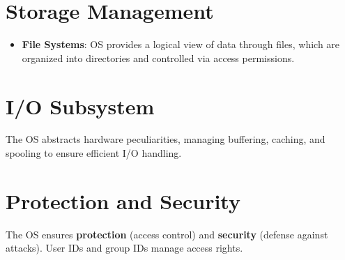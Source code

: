 \documentclass{article}
\begin{document}
\section{Storage Management}
\begin{itemize}
    \item \textbf{File Systems}: OS provides a logical view of data through files, which are organized into directories and controlled via access permissions.
\end{itemize}

\section{I/O Subsystem}
The OS abstracts hardware peculiarities, managing buffering, caching, and spooling to ensure efficient I/O handling.

\section{Protection and Security}
The OS ensures \textbf{protection} (access control) and \textbf{security} (defense against attacks). User IDs and group IDs manage access rights.
\end{document}
